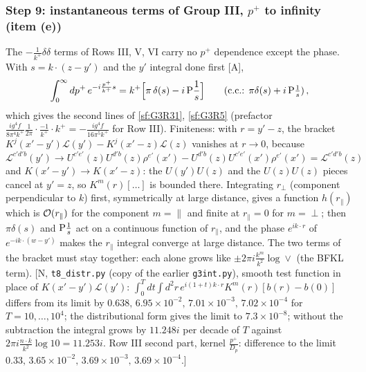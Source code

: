 \documentclass[10pt]{article}
\begin{document}
\subsubsection{Step 9: instantaneous terms of Group III, $p^{+}$ to infinity (item (e))}
\noindent The $-\frac{1}{k^{+}}\delta\delta$ terms of Rows III, V, VI carry no $p^{+}$ dependence except the phase. With $s=k\cdot(z-y')$ and the $y'$ integral done first [A],
\begin{align}
\int_{0}^{\infty}dp^{+}\,e^{-i\frac{p^{+}}{k^{+}}s}=k^{+}\Big[\pi\,\delta(s)-i\,{\rm P}\frac1s\Big]\qquad(\text{c.c.: }\pi\delta(s)+i\,{\rm P}\tfrac1s)\,,\label{sf:distr}
\end{align}
which gives the second lines of \eqref{sf:G3R31}, \eqref{sf:G3R5} (prefactor $\frac{ig^{4}f}{8\pi^{4}k^{+}}\frac{1}{2\pi}\cdot\frac{-1}{k^{+}}\cdot k^{+}=-\frac{ig^{4}f}{16\pi^{5}k^{+}}$ for Row III). Finiteness: with $r=y'-z$, the bracket $K^{j}(x'-y')\mathcal{L}(y')-K^{j}(x'-z)\mathcal{L}(z)$ vanishes at $r\to0$, because $\mathcal{L}^{c'd'b}(y')\to U^{c'e'}(z)U^{d'b}(z)\rho^{e'}(x')-U^{d'b}(z)U^{c'e'}(x')\rho^{e'}(x')=\mathcal{L}^{c'd'b}(z)$ and $K(x'-y')\to K(x'-z)$: the $U(y')U(z)$ and the $U(z)U(z)$ pieces cancel at $y'=z$, so $K^{m}(r)[\dots]$ is bounded there. Integrating $r_{\perp}$ (component perpendicular to $k$) first, symmetrically at large distance, gives a function $h(r_{\parallel})$ which is ${\cal O}(r_{\parallel})$ for the component $m=\parallel$ and finite at $r_{\parallel}=0$ for $m=\perp$; then $\pi\delta(s)$ and ${\rm P}\frac1s$ act on a continuous function of $r_{\parallel}$, and the phase $e^{ik\cdot r}$ of $e^{-ik\cdot(w-y')}$ makes the $r_{\parallel}$ integral converge at large distance. The two terms of the bracket must stay together: each alone grows like $\pm2\pi i\frac{k^{m}}{k^{2}}\log\vee$ (the BFKL term). [N, \texttt{t8\_distr.py} (copy of the earlier \texttt{g3int.py}), smooth test function in place of $K(x'-y')\mathcal{L}(y')$: $\int_{0}^{T}dt\int d^{2}r\,e^{i(1+t)k\cdot r}K^{m}(r)[b(r)-b(0)]$ differs from its limit by $0.638,\,6.95\times10^{-2},\,7.01\times10^{-3},\,7.02\times10^{-4}$ for $T=10,\dots,10^{4}$; the distributional form gives the limit to $7.3\times10^{-8}$; without the subtraction the integral grows by $11.248i$ per decade of $T$ against $2\pi i\frac{n\cdot k}{k^{2}}\log10=11.253i$. Row III second part, kernel $\frac{p^{+}}{D_{p}}$: difference to the limit $0.33,\,3.65\times10^{-2},\,3.69\times10^{-3},\,3.69\times10^{-4}$.]
\end{document}
